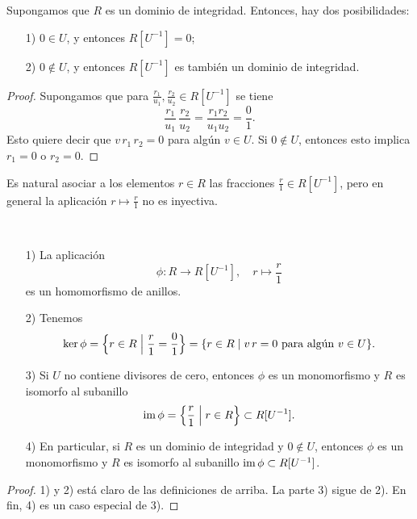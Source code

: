 \begin{observacion}
  \label{obs:localizacion-de-dominios}
  Supongamos que $R$ es un dominio de integridad. Entonces, hay dos
  posibilidades:

  \begin{enumerate}
  \item[1)] $0 \in U$, y entonces $R [U^{-1}] = 0$;

  \item[2)] $0 \notin U$, y entonces $R [U^{-1}]$ es también un dominio
    de integridad.
  \end{enumerate}

  \begin{proof}
    Supongamos que para $\frac{r_1}{u_1}, \frac{r_2}{u_2} \in R [U^{-1}]$ se
    tiene
    $$\frac{r_1}{u_1}\,\frac{r_2}{u_2} = \frac{r_1 r_2}{u_1 u_2} = \frac{0}{1}.$$
    Esto quiere decir que $v\,r_1\,r_2 = 0$ para algún $v\in U$.
    Si $0 \notin U$, entonces esto implica $r_1 = 0$ o $r_2 = 0$.
  \end{proof}
\end{observacion}

Es natural asociar a los elementos $r\in R$ las fracciones
$\frac{r}{1} \in R [U^{-1}]$, pero en general la aplicación
$r \mapsto \frac{r}{1}$ no es inyectiva.

\begin{observacion}
  ~

  \begin{enumerate}
  \item[1)] La aplicación
    $$\phi\colon R \to R [U^{-1}], \quad r \mapsto \frac{r}{1}$$
    es un homomorfismo de anillos.

  \item[2)] Tenemos
    \[ \ker \phi =
       \Bigl\{ r \in R \Bigm| \frac{r}{1} = \frac{0}{1} \Bigr\} =
       \{ r\in R \mid v\,r = 0\text{ para algún }v\in U \}. \]

   \item[3)] Si $U$ no contiene divisores de cero, entonces $\phi$ es
     un monomorfismo y $R$ es isomorfo al subanillo
    $$\operatorname{im} \phi = \Bigl\{ \frac{r}{1} \Bigm| r\in R \Bigr\} \subset R [U^{-1}].$$

  \item[4)] En particular, si $R$ es un dominio de integridad y $0 \notin U$,
    entonces $\phi$ es un monomorfismo y $R$ es isomorfo al subanillo
    $\operatorname{im} \phi \subset R [U^{-1}]$.
  \end{enumerate}

  \begin{proof}
    1) y 2) está claro de las definiciones de arriba. La parte 3) sigue
    de 2). En fin, 4) es un caso especial de 3).
  \end{proof}
\end{observacion}

